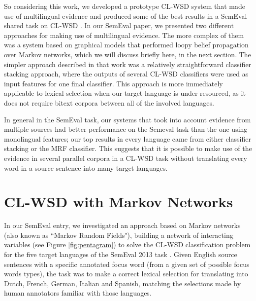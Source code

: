So considering this work, we developed a prototype CL-WSD system that made use
of multilingual evidence \cite{rudnick-liu-gasser:2013:SemEval-2013} and
produced some of the best results in a SemEval shared task on CL-WSD
\cite{task10}.  In our SemEval paper, we presented two different approaches for
making use of multilingual evidence. The more complex of them was a system
based on graphical models that performed loopy belief propagation over Markov
networks, which we will discuss briefly here, in the next section.
The simpler approach described in that work was a relatively straightforward
classifier stacking approach, where the outputs of several CL-WSD classifiers
were used as input features for one final classifier. This approach is more
immediately applicable to lexical selection when our target language is
under-resourced, as it does not require bitext corpora between all of the
involved languages.

In general in the SemEval task, our systems that took into account evidence
from multiple sources had better performance on the Semeval task than the one
using monolingual features; our top results in every language came from either
classifier stacking or the MRF classifier. This suggests that it is possible to
make use of the evidence in several parallel corpora in a CL-WSD task without
translating every word in a source sentence into many target languages.

\section{CL-WSD with Markov Networks}
In our SemEval entry, we investigated an approach based on Markov networks
(also known as ``Markov Random Fields"), building a network of interacting
variables (see Figure \ref{fig:pentagram}) to solve the CL-WSD classification
problem for the five target languages of the SemEval 2013 task \cite{task10}.
Given English source sentences with a specific annotated focus word (from a
given set of possible focus words types), the task was to make a correct
lexical selection for translating into Dutch, French, German, Italian and
Spanish, matching the selections made by human annotators familiar with those
languages.

